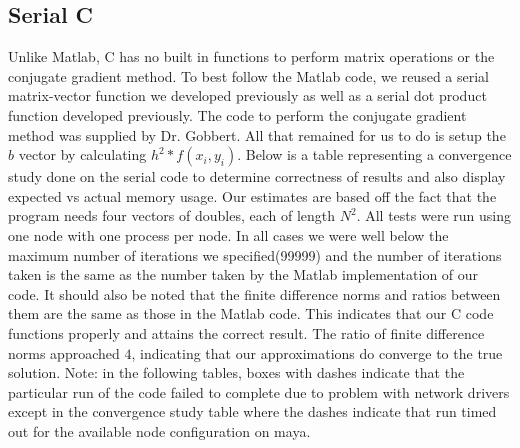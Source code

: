 \documentclass[11pt]{article}
\begin{document}
\subsection{Serial C}
Unlike Matlab, C has no built in functions to perform matrix operations or the conjugate gradient method. To best follow the Matlab code, we reused a serial matrix-vector function we developed previously as well as a serial dot product function developed previously. The code to perform the conjugate gradient method was supplied by Dr. Gobbert. All that remained for us to do is setup the $b$ vector by calculating $h^2 * f(x_i, y_i)$. Below is a table representing a convergence study done on the serial code to determine correctness of results and also display expected vs actual memory usage. Our estimates are based off the fact that the program needs four vectors of doubles, each of length $N^2$. All tests were run using one node with one process per node. In all cases we were well below the maximum number of iterations we specified(99999) and the number of iterations taken is the same as the number taken by the Matlab implementation of our code. It should also be noted that the finite difference norms and ratios between them are the same as those in the Matlab code. This indicates that our C code functions properly and attains the correct result. The ratio of finite difference norms approached $4$, indicating that our approximations do converge to the true solution. Note: in the following tables, boxes with dashes indicate that the particular run of the code failed to complete due to problem with network drivers except in the convergence study table where the dashes indicate that run timed out for the available node configuration on maya.
\end{document}
